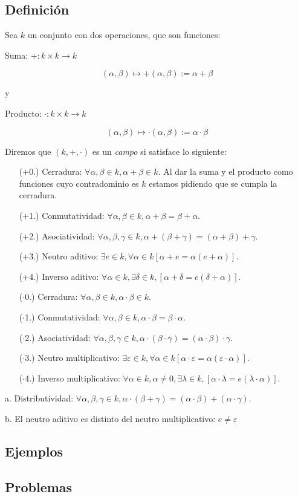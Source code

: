 \subsection*{Definición}
Sea \( k \) un conjunto con dos operaciones, que son funciones:

Suma: \( + : k \times k \rightarrow k \)

\[ (\alpha, \beta) \mapsto +(\alpha,\beta) := \alpha + \beta \]

y

Producto: \( \cdot : k \times k \rightarrow k \)

\[ (\alpha, \beta) \mapsto \cdot(\alpha,\beta) := \alpha \cdot \beta \]

Diremos que \( (k, +, \cdot) \) es un \textit{campo} si satisface lo siguiente:

\begin{itemize}
  \item[(+0.)] Cerradura: \( \forall \alpha, \beta \in k, \alpha + \beta \in k \). Al dar la suma y el producto como funciones cuyo contradominio es \( k \) estamos pidiendo que se cumpla la cerradura.
  \item[(+1.)] Conmutatividad: \( \forall \alpha, \beta \in k, \alpha + \beta = \beta + \alpha \).
  \item[(+2.)] Asociatividad: \( \forall \alpha, \beta, \gamma \in k, \alpha + (\beta + \gamma) = (\alpha + \beta) + \gamma \).
  \item[(+3.)] Neutro aditivo: \( \exists e \in k, \forall \alpha \in k [\alpha + e = \alpha (e + \alpha)] \).
  \item[(+4.)] Inverso aditivo: \( \forall \alpha \in k, \exists \delta \in k, [\alpha + \delta = e(\delta + \alpha)] \).
  \item[($\cdot$0.)] Cerradura: \( \forall \alpha, \beta \in k, \alpha \cdot \beta \in k \).
  \item[($\cdot$1.)] Conmutatividad: \( \forall \alpha, \beta \in k, \alpha \cdot \beta = \beta \cdot \alpha \).
  \item[($\cdot$2.)] Asociatividad: \( \forall \alpha, \beta, \gamma \in k, \alpha \cdot (\beta \cdot \gamma) = (\alpha \cdot \beta) \cdot \gamma \).
  \item[($\cdot$3.)] Neutro multiplicativo: \( \exists \varepsilon \in k, \forall \alpha \in k [\alpha \cdot \varepsilon = \alpha (\varepsilon \cdot \alpha)] \).
  \item[($\cdot$4.)] Inverso multiplicativo: \( \forall \alpha \in k, \alpha \neq 0, \exists \lambda \in k, [\alpha \cdot \lambda = e (\lambda \cdot \alpha)] \).
\end{itemize}

a. Distributividad: \( \forall \alpha, \beta, \gamma \in k, \alpha \cdot (\beta + \gamma) = (\alpha \cdot \beta) + (\alpha \cdot \gamma) \).

b. El neutro aditivo es distinto del neutro multiplicativo: \( e \neq \varepsilon \)

\subsection*{Ejemplos}


\subsection*{Problemas}